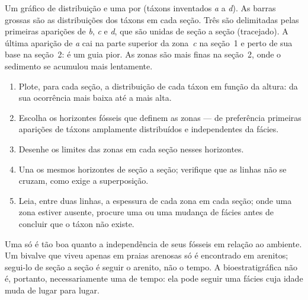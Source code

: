 \begin{omfigure}
{\small Um gráfico de distribuição e uma  por  (táxons inventados \emph{a} a
\emph{d}). As barras grossas são as distribuições dos táxons em cada seção. Três  são delimitadas pelas primeiras aparições de \emph{b}, \emph{c} e \emph{d}, que são
unidas de seção a seção (tracejado). A última aparição de \emph{a} cai na parte superior da
zona~\emph{c} na seção~1 e perto de sua base na seção~2: é um guia pior. As zonas são mais
finas na seção~2, onde o sedimento se acumulou mais lentamente.}
\label{fig:b1:stratigraphic-scale:range-chart}
\end{omfigure}

\begin{method}\label{met:b1:stratigraphic-scale:biozones}
\begin{enumerate}
  \item Plote, para cada seção, a distribuição de cada táxon em função da altura: da sua
        ocorrência mais baixa até a mais alta.
  \item Escolha os horizontes fósseis que definem as zonas --- de preferência primeiras
        aparições de táxons amplamente distribuídos e independentes da fácies.
  \item Desenhe os limites das zonas em cada seção nesses horizontes.
  \item Una os mesmos horizontes de seção a seção; verifique que as linhas não se cruzam,
        como exige a superposição.
  \item Leia, entre duas linhas, a espessura de cada zona em cada seção; onde uma zona
        estiver ausente, procure uma  ou uma mudança de fácies antes de concluir
        que o táxon não existe.
\end{enumerate}
\end{method}

Uma  só é tão boa quanto a independência de seus fósseis em relação ao ambiente. Um
bivalve que viveu apenas em praias arenosas só é encontrado em arenitos; segui-lo de seção a
seção é seguir o arenito, não o tempo. A  bioestratigráfica não é, portanto,
necessariamente uma  de tempo: ela pode seguir uma fácies cuja idade muda de lugar
para lugar.

